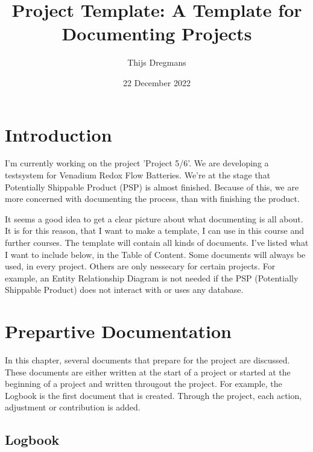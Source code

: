 \documentclass[10pt]{report}
\title{Project Template: A Template for Documenting Projects}
\author{Thijs Dregmans}
\date{22 December 2022}
\begin{document}
\maketitle

\chapter{Introduction}

I'm currently working on the project 'Project 5/6'. We are developing a testsystem for Venadium Redox Flow Batteries. We're at the stage that Potentially Shippable Product (PSP) is almost finished. Because of this, we are more concerned with documenting the process, than with finishing the product.

It seems a good idea to get a clear picture about what documenting is all about. It is for this reason, that I want to make a template, I can use in this course and further courses. The template will contain all kinds of documents. I've listed what I want to include below, in the Table of Content. Some documents will always be used, in every project. Others are only nessecary for certain projects. For example, an Entity Relationship Diagram is not needed if the PSP (Potentially Shippable Product) does not interact with or uses any database.

\newpage

\tableofcontents

\newpage

\chapter{Prepartive Documentation}

In this chapter, several documents that prepare for the project are discussed. These documents are either written at the start of a project or started at the beginning of a project and written througout the project. For example, the Logbook is the first document that is created. Through the project, each action, adjustment or contribution is added.

\medskip
\minitoc

\newpage

\section{Logbook}
\end{document}
